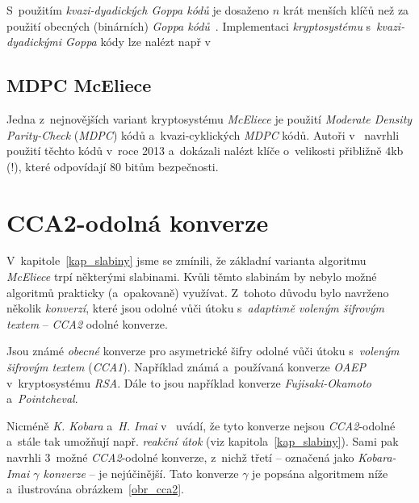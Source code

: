 \documentclass[thesis=M,czech,hidelinks]{FITthesis}[2012/06/26]
\newcommand{\0}{{\textcolor[gray]{0.75}{0}}}
\begin{document}
S~použitím \emph{kvazi-dyadických Goppa kódů} je dosaženo $n$ krát menších klíčů
než za použití obecných (binárních) \emph{Goppa kódů}~\cite{Misoczki1}.
Implementaci \emph{kryptosystému} s~\emph{kvazi-dyadickými Goppa} kódy lze
nalézt např v~\cite{Paustjan,Kratochvil}


\subsection{MDPC McEliece}\label{kap_MDPC}

Jedna z~nejnovějších variant kryptosystému \emph{McEliece} je použití
\emph{Moderate Density Parity-Check} (\emph{MDPC}) kódů a~kvazi-cyklických
\emph{MDPC} kódů.  Autoři v~\cite{Misoczki2} navrhli použití těchto kódů v~roce
2013 a~dokázali nalézt klíče o~velikosti přibližně $4$\;kb (!), které odpovídají
$80$ bitům bezpečnosti.



\section{CCA2-odolná konverze}\label{kap_cca2}

V~kapitole~\ref{kap_slabiny} jsme se zmínili, že základní varianta algoritmu
\emph{McEliece} trpí některými slabinami. Kvůli těmto slabinám by nebylo možné
algoritmů prakticky (a~opakovaně) využívat. Z~tohoto důvodu bylo navrženo
několik \emph{konverzí}, které jsou odolné vůči útoku s~\emph{adaptivně voleným
šifrovým textem} -- \emph{CCA2} odolné konverze.

Jsou známé \emph{obecné} konverze pro asymetrické šifry odolné vůči útoku
s~\emph{voleným šifrovým textem} (\emph{CCA1}). Například známá a~používaná
konverze \emph{OAEP} v~kryptosystému \emph{RSA}. Dále to jsou například konverze
\emph{Fujisaki-Okamoto} a~\emph{Pointcheval}.

Nicméně \emph{K. Kobara} a~\emph{H. Imai} v~\cite{Kobara} uvádí, že tyto
konverze nejsou \emph{CCA2}-odolné a~stále tak umožňují např. \emph{reakční
útok} (viz kapitola~\ref{kap_slabiny}). Sami pak navrhli 3~možné
\emph{CCA2}-odolné konverze, z~nichž třetí -- označená jako \emph{Kobara-Imai
$\gamma$ konverze} -- je nejúčinější. Tato konverze $\gamma$ je popsána
algoritmem níže a~ilustrována obrázkem~\ref{obr_cca2}.
\end{document}
